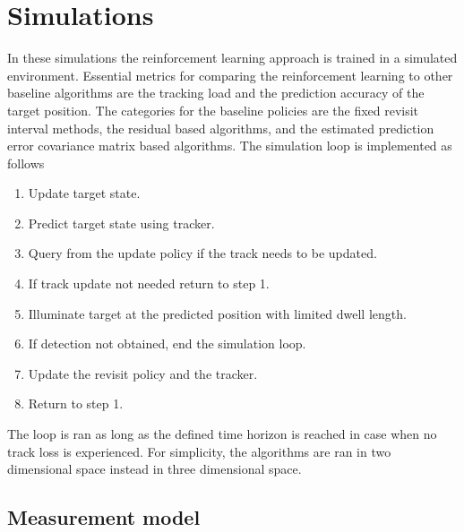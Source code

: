 \documentclass[english, 12pt, a4paper, elec, utf8, a-1b, online]{aaltothesis}
\begin{document}
\newpage
\section{Simulations}


In these simulations the reinforcement learning approach is trained in a simulated environment.
Essential metrics for comparing the reinforcement learning to other baseline algorithms are the tracking load and the prediction accuracy of the target position.
The categories for the baseline policies are the fixed revisit interval methods, the residual based algorithms, and the estimated prediction error covariance matrix based algorithms.
The simulation loop is implemented as follows
\begin{enumerate}
    \item Update target state.
    \item Predict target state using tracker.
    \item Query from the update policy if the track needs to be updated.
    \item If track update not needed return to step 1.
    \item Illuminate target at the predicted position with limited dwell length.
    \item If detection not obtained, end the simulation loop.
    \item Update the revisit policy and the tracker.
    \item Return to step 1.
\end{enumerate}
The loop is ran as long as the defined time horizon is reached in case when no track loss is experienced.
For simplicity, the algorithms are ran in two dimensional space instead in three dimensional space.

\subsection{Measurement model}
\end{document}
